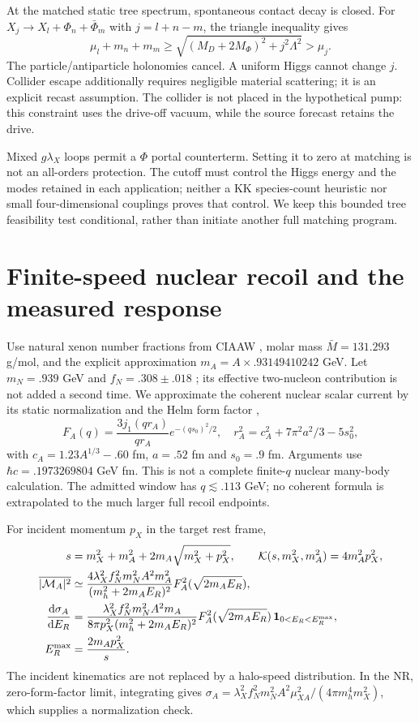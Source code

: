 \documentclass[11pt,a4paper]{article}
\newcommand{\dd}{\mathrm d}
\begin{document}
At the matched static tree spectrum, spontaneous contact decay is
closed. For $X_j\to X_l+\Phi_n+\bar\Phi_m$ with $j=l+n-m$,
the triangle inequality gives
\begin{equation}
 \mu_l+m_n+m_m
 \geq\sqrt{(M_D+2M_\Phi)^2+j^2\Lambda^2}>\mu_j.
\end{equation}
The particle/antiparticle holonomies cancel. A uniform Higgs cannot
change $j$. Collider escape additionally requires negligible material
scattering; it is an explicit recast assumption. The collider is not
placed in the hypothetical pump: this constraint uses the drive-off
vacuum, while the source forecast retains the drive.

Mixed $g\lambda_X$ loops permit a $\Phi$ portal counterterm. Setting it
to zero at matching is not an all-orders protection. The cutoff must
control the Higgs energy and the modes retained in each application;
neither a KK species-count heuristic nor small four-dimensional
couplings proves that control. We keep this bounded tree feasibility
test conditional, rather than initiate another full matching program.

\section{Finite-speed nuclear recoil and the measured response}
Use natural xenon number fractions from CIAAW \cite{xe}, molar mass
$\bar M=131.293$ g/mol, and the explicit approximation
$m_A=A\times.93149410242$ GeV. Let $m_N=.939$ GeV and
$f_N=.308\pm.018$ \cite{fn}; its effective two-nucleon contribution is
not added a second time. We approximate the coherent nuclear scalar
current by its static normalization and the Helm form factor
\cite{helm},
\begin{equation}
 F_A(q)=\frac{3j_1(qr_A)}{qr_A}e^{-(qs_0)^2/2},\quad
 r_A^2=c_A^2+7\pi^2a^2/3-5s_0^2,
\end{equation}
with $c_A=1.23A^{1/3}-.60$ fm, $a=.52$ fm and $s_0=.9$ fm.
Arguments use $\hbar c=.1973269804$ GeV fm. This is not a complete
finite-$q$ nuclear many-body calculation. The admitted window has
$q\lesssim.113$ GeV; no coherent formula is extrapolated to the much
larger full recoil endpoints.

For incident momentum $p_X$ in the target rest frame,
\begin{align}
 s&=m_X^2+m_A^2+2m_A\sqrt{m_X^2+p_X^2},\qquad
 {\cal K}(s,m_X^2,m_A^2)=4m_A^2p_X^2,\\
 \overline{|{\cal M}_A|^2}
 &\simeq\frac{4\lambda_X^2 f_N^2m_N^2A^2m_A^2}
 {(m_h^2+2m_AE_R)^2}F_A^2(\sqrt{2m_AE_R}),\\
 \frac{\dd\sigma_A}{\dd E_R}
 &=\frac{\lambda_X^2f_N^2m_N^2A^2m_A}
 {8\pi p_X^2(m_h^2+2m_AE_R)^2}
 F_A^2(\sqrt{2m_AE_R})\,\mathbf1_{0<E_R<E_R^{\max}},\\
 E_R^{\max}&=\frac{2m_Ap_X^2}{s}.
\end{align}
The incident kinematics are not replaced by a halo-speed distribution.
In the NR, zero-form-factor limit, integrating gives
$\sigma_A=\lambda_X^2f_N^2m_N^2A^2\mu_{XA}^2/
(4\pi m_h^4m_X^2)$, which supplies a normalization check.
\end{document}
